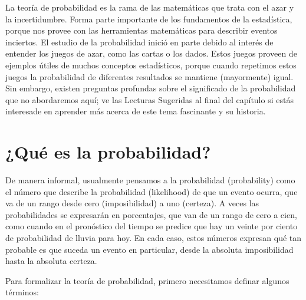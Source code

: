 \documentclass[
  12pt,
]{book}
\theoremstyle{definition}
\theoremstyle{definition}
\theoremstyle{definition}
\theoremstyle{remark}
\begin{document}
La teoría de probabilidad es la rama de las matemáticas que trata con el azar y la incertidumbre. Forma parte importante de los fundamentos de la estadística, porque nos provee con las herramientas matemáticas para describir eventos inciertos. El estudio de la probabilidad inició en parte debido al interés de entender los juegos de azar, como las cartas o los dados. Estos juegos proveen de ejemplos útiles de muchos conceptos estadísticos, porque cuando repetimos estos juegos la probabilidad de diferentes resultados se mantiene (mayormente) igual. Sin embargo, existen preguntas profundas sobre el significado de la probabilidad que no abordaremos aquí; ve las Lecturas Sugeridas al final del capítulo si estás interesade en aprender más acerca de este tema fascinante y su historia.

\hypertarget{quuxe9-es-la-probabilidad}{%
\section{¿Qué es la probabilidad?}\label{quuxe9-es-la-probabilidad}}

De manera informal, usualmente pensamos a la probabilidad (probability) como el número que describe la probabilidad (likelihood) de que un evento ocurra, que va de un rango desde cero (imposibilidad) a uno (certeza). A veces las probabilidades se expresarán en porcentajes, que van de un rango de cero a cien, como cuando en el pronóstico del tiempo se predice que hay un veinte por ciento de probabilidad de lluvia para hoy. En cada caso, estos números expresan qué tan probable es que suceda un evento en particular, desde la absoluta imposibilidad hasta la absoluta certeza.

Para formalizar la teoría de probabilidad, primero necesitamos definar algunos términos:
\end{document}
